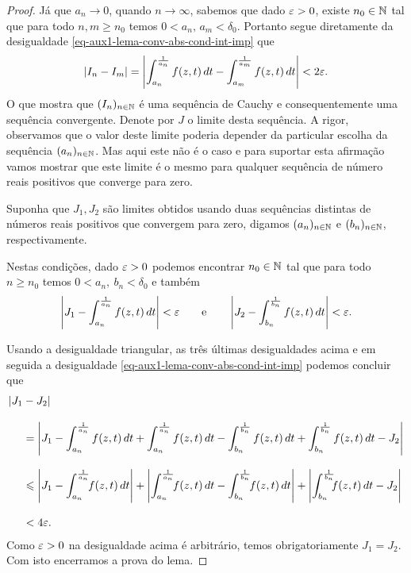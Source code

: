 \begin{proof}
        Já que $a_n\to 0$, quando $n\to\infty$, sabemos que dado 
        $\varepsilon>0$, existe $n_0\in\mathbb{N}$ tal que para todo $n,m\geqslant n_0$
        temos $0< a_n,\, a_m <\delta_0$. Portanto segue diretamente da desigualdade \eqref{eq-aux1-lema-conv-abs-cond-int-imp}
        que 
        \begin{align*}
            |I_n - I_m| 
            = 
            \left| 
            \int_{a_n}^{ \frac{1}{a_n} }f(z,t) \, dt 
            - \int_{ a_{m} }^{ \frac{1}{a_m} }f(z,t) \, dt 
            \right|
            <2\varepsilon.
        \end{align*}
        O que mostra que $(I_n)_{n\in\mathbb{N}}$ é uma sequência de Cauchy
        e consequentemente uma sequência convergente. 
        Denote por $J$ o limite desta sequência. 
        A rigor, observamos que o valor deste limite poderia depender 
        da particular escolha da sequência $(a_n)_{n\in\mathbb{N}}$. 
        Mas aqui este não é o caso e para suportar esta afirmação  
        vamos mostrar que este limite é o 
        mesmo para qualquer sequência de número reais positivos 
        que converge para zero. 
        
        Suponha que $J_1, J_2$ são limites obtidos usando 
        duas sequências distintas de números reais positivos que convergem para zero, digamos $(a_n)_{n\in\mathbb{N}}$ e $(b_n)_{n\in\mathbb{N}}$,
        respectivamente. 
        
        Nestas condições, dado $\varepsilon>0$ podemos encontrar $n_0\in\mathbb{N}$ tal 
        que para todo $n\geqslant n_0$ temos
        $0<a_n,\ b_n <\delta_0$ e também
        \[
        \left|J_1-\int_{a_n}^{ \frac{1}{a_n} }f(z,t) \, dt \right|<\varepsilon
        \qquad\text{e}\qquad
        \left|J_2-\int_{b_n}^{ \frac{1}{b_n} }f(z,t) \, dt \right|<\varepsilon.
        \]
        
        Usando a desigualdade triangular, 
        as três últimas desigualdades acima e em seguida a desigualdade \eqref{eq-aux1-lema-conv-abs-cond-int-imp}
        podemos concluir que 
        \begin{align*}
            |J_1& - J_2| 
            \\[0.3cm]
            &= 
            \left| 
            J_1-\int_{a_n}^{ \frac{1}{a_n} }f(z,t) \, dt 
            +\int_{a_n}^{ \frac{1}{a_n} }f(z,t) \, dt 
            - \int_{ b_{n} }^{ \frac{1}{b_n} }f(z,t) \, dt
            +
             \int_{ b_{n} }^{ \frac{1}{b_n} }f(z,t) \, dt
             -J_2
            \right| 
            \\[0.3cm]
            &\leqslant
            \left| 
            J_1-\int_{a_n}^{ \frac{1}{a_n} }\!\! f(z,t) \, dt 
            \right|
            +
            \left|
            \int_{a_n}^{ \frac{1}{a_n} }\!\! f(z,t) \, dt 
            - \int_{ b_{n} }^{ \frac{1}{b_n} }\!\! f(z,t) \, dt
            \right|
            +
            \left|
             \int_{ b_{n} }^{ \frac{1}{b_n} }\!\!\! f(z,t) \, dt
             -J_2
            \right|
            \\[0.3cm]
            &<4\e.
        \end{align*}
       Como $\varepsilon>0$ na desigualdade acima é arbitrário, 
       temos obrigatoriamente $J_1=J_2$. 
       Com isto encerramos a prova do lema.
    \end{proof}
